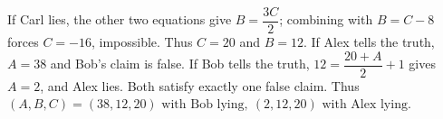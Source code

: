 If Carl lies, the other two equations give $B=\dfrac{3C}{2}$; combining with $B=C-8$ forces $C=-16$, impossible. Thus $C=20$ and $B=12$. If Alex tells the truth, $A=38$ and Bob's claim is false. If Bob tells the truth, $12=\dfrac{20+A}{2}+1$ gives $A=2$, and Alex lies. Both satisfy exactly one false claim. Thus $\boxed{(A,B,C)=(38,12,20)\text{ with Bob lying},\ (2,12,20)\text{ with Alex lying}}$.
